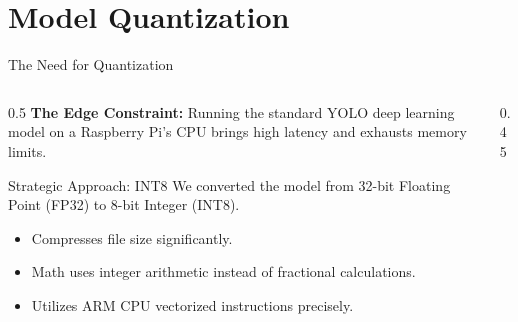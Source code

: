 \documentclass[aspectratio=169,11pt]{beamer}
\begin{document}
\section{Model Quantization}

\begin{frame}{The Need for Quantization}
\begin{columns}
\begin{column}{0.5\textwidth}
\textbf{The Edge Constraint:}
Running the standard YOLO deep learning model on a Raspberry Pi's CPU brings high latency and exhausts memory limits.

\vspace{0.8em}
\begin{block}{Strategic Approach: INT8}
We converted the model from 32-bit Floating Point (FP32) to 8-bit Integer (INT8).
\begin{itemize}
    \item Compresses file size significantly.
    \item Math uses integer arithmetic instead of fractional calculations.
    \item Utilizes ARM CPU vectorized instructions precisely.
\end{itemize}
\end{block}
\end{column}
\begin{column}{0.45\textwidth}
\centering
{}
\end{column}
\end{columns}
\end{frame}
\end{document}
